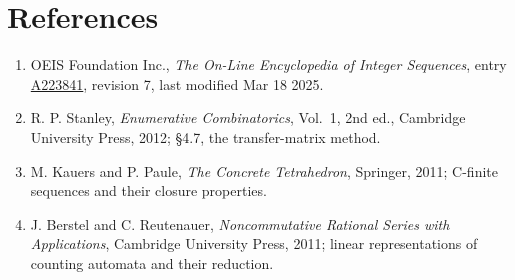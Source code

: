 \documentclass[11pt]{article}
\theoremstyle{definition}
\begin{document}
\section{References}

\begin{enumerate}

\item OEIS Foundation Inc., \emph{The On-Line Encyclopedia of Integer Sequences}, entry \href{https://oeis.org/A223841}{A223841}, revision 7, last modified Mar 18 2025.

\item R. P. Stanley, \emph{Enumerative Combinatorics}, Vol.~1, 2nd ed., Cambridge University Press, 2012; \S4.7, the transfer-matrix method.

\item M. Kauers and P. Paule, \emph{The Concrete Tetrahedron}, Springer, 2011; C-finite sequences and their closure properties.

\item J. Berstel and C. Reutenauer, \emph{Noncommutative Rational Series with Applications}, Cambridge University Press, 2011; linear representations of counting automata and their reduction.

\end{enumerate}
\end{document}

